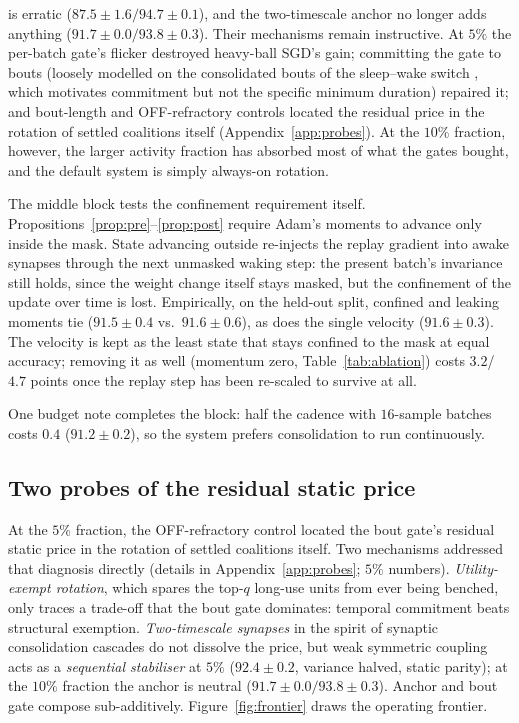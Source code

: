 \documentclass{article}
\begin{document}
is erratic ($87.5\pm1.6/94.7\pm0.1$), and the two-timescale anchor no longer adds anything
($91.7\pm0.0/93.8\pm0.3$). Their mechanisms remain instructive. At $5\%$ the per-batch gate's
flicker destroyed heavy-ball SGD's gain; committing the gate to bouts (loosely modelled on
the consolidated bouts of the sleep--wake switch \citep{saper2005}, which motivates commitment
but not the specific minimum duration) repaired it; and bout-length and OFF-refractory
controls located the residual price in the rotation of settled coalitions itself
(Appendix~\ref{app:probes}). At the $10\%$ fraction, however, the larger activity fraction
has absorbed most of what the gates bought, and the default system is simply always-on
rotation.

The middle block tests the confinement requirement itself.
Propositions~\ref{prop:pre}--\ref{prop:post} require Adam's moments to advance only inside
the mask. State advancing outside re-injects the replay gradient into awake synapses through
the next unmasked waking step: the present batch's invariance still holds, since the weight
change itself stays masked, but the confinement of the update over time is lost.
Empirically, on the held-out split, confined and leaking moments tie ($91.5\pm0.4$ vs.\
$91.6\pm0.6$), as does the single velocity ($91.6\pm0.3$). The velocity is kept as the least
state that stays confined to the mask at equal accuracy; removing it as well (momentum zero,
Table~\ref{tab:ablation}) costs $3.2$/$4.7$ points once the replay step has been re-scaled
to survive at all.

One budget note completes the block: half the cadence with $16$-sample batches costs $0.4$
($91.2\pm0.2$), so the system prefers consolidation to run continuously.

\subsection{Two probes of the residual static price}
At the $5\%$ fraction, the OFF-refractory control located the bout gate's residual static
price in the rotation of settled coalitions itself. Two mechanisms addressed that diagnosis
directly (details in Appendix~\ref{app:probes}; $5\%$ numbers). \emph{Utility-exempt
rotation}, which spares the top-$q$ long-use units from ever being benched, only traces a
trade-off that the bout gate dominates: temporal commitment beats structural exemption.
\emph{Two-timescale synapses} in the spirit of synaptic consolidation cascades
\citep{benna2016} do not dissolve the price, but weak symmetric coupling acts as a
\emph{sequential stabiliser} at $5\%$ ($92.4\pm0.2$, variance halved, static parity); at the
$10\%$ fraction the anchor is neutral ($91.7\pm0.0/93.8\pm0.3$). Anchor and bout gate compose
sub-additively. Figure~\ref{fig:frontier} draws the operating frontier.
\end{document}
